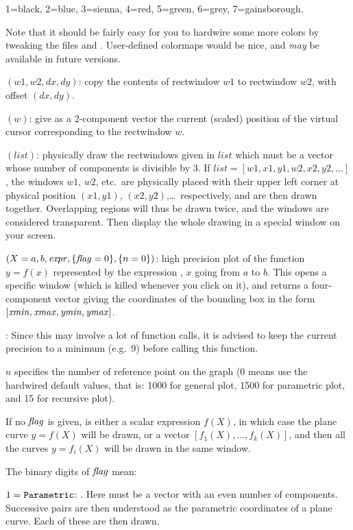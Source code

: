 1=black, 2=blue, 3=sienna, 4=red, 5=green, 6=grey, 7=gainsborough.

Note that it should be fairly easy for you to hardwire some more colors by
tweaking the files  and . User-defined
colormaps would be nice, and \emph{may} be available in future versions.

$(w1,w2,dx,dy)$: copy the contents of rectwindow
$w1$ to rectwindow $w2$, with offset $(dx,dy)$.

$(w)$: give as a 2-component vector the current
(scaled) position of the virtual cursor corresponding to the rectwindow $w$.

$(list)$: physically draw the rectwindows given in $list$
which must be a vector whose number of components is divisible by 3. If
$list=[w1,x1,y1,w2,x2,y2,\dots]$, the windows $w1$, $w2$, etc.~are
physically placed with their upper left corner at physical position
$(x1,y1)$, $(x2,y2)$,\dots\ respectively, and are then drawn together.
Overlapping regions will thus be drawn twice, and the windows are considered
transparent. Then display the whole drawing in a special window on your
screen.

$(X=a,b,\hbox{\it expr\/},\{\hbox{\it f\kern0pt lag\/}=0\},\{n=0\})$: high precision
plot of the function $y=f(x)$ represented by the expression , $x$
going from $a$ to $b$. This opens a specific window (which is killed
whenever you click on it), and returns a four-component vector giving the
coordinates of the bounding box in the form
$[\hbox{\it xmin\/},\hbox{\it xmax\/},\hbox{\it ymin\/},\hbox{\it ymax\/}]$.

: Since this may involve a lot of function calls,
it is advised to keep the current precision to a minimum (e.g.~9) before
calling this function.

$n$ specifies the number of reference point on the graph (0 means use the
hardwired default values, that is: 1000 for general plot, 1500 for
parametric plot, and 15 for recursive plot).

If no $\hbox{\it f\kern0pt lag\/}$ is given,  is either a scalar expression $f(X)$, in which
case the plane curve $y=f(X)$ will be drawn, or a vector
$[f_1(X),\dots,f_k(X)]$, and then all the curves $y=f_i(X)$ will be drawn in
the same window.

\noindent The binary digits of $\hbox{\it f\kern0pt lag\/}$ mean:

\item $1 = {\tt Parametric}$: . Here  must
be a vector with an even number of components. Successive pairs are then
understood as the parametric coordinates of a plane curve. Each of these are
then drawn.

